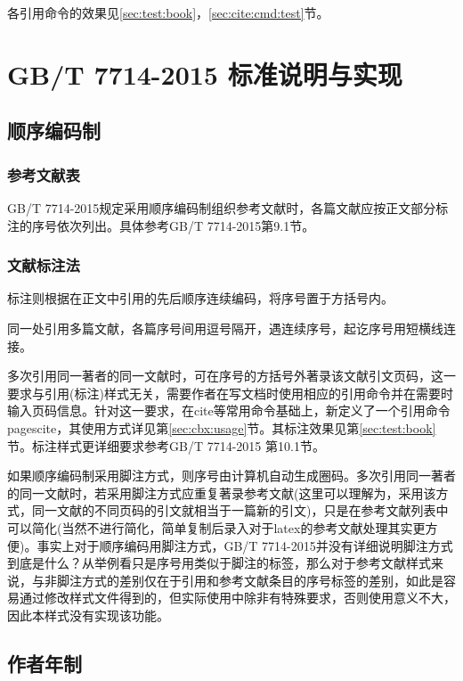 各引用命令的效果见\ref{sec:test:book}，\ref{sec:cite:cmd:test}节。

\section{GB/T 7714-2015 标准说明与实现}

\subsection{顺序编码制}

\subsubsection{参考文献表}\label{sec:bib:serialno}

GB/T 7714-2015规定采用顺序编码制组织参考文献时，各篇文献应按正文部分标注的序号依次列出。具体参考GB/T 7714-2015第9.1节。

\subsubsection{文献标注法}
标注则根据在正文中引用的先后顺序连续编码，将序号置于方括号内。

同一处引用多篇文献，各篇序号间用逗号隔开，遇连续序号，起讫序号用短横线连接。

多次引用同一著者的同一文献时，可在序号的方括号外著录该文献引文页码，这一要求与引用(标注)样式无关，需要作者在写文档时使用相应的引用命令并在需要时输入页码信息。针对这一要求，在cite等常用命令基础上，新定义了一个引用命令pagescite，其使用方式详见第\ref{sec:cbx:usage}节。其标注效果见第\ref{sec:test:book}节。标注样式更详细要求参考GB/T 7714-2015 第10.1节。

如果顺序编码制采用脚注方式，则序号由计算机自动生成圈码。多次引用同一著者的同一文献时，若采用脚注方式应重复著录参考文献(这里可以理解为，采用该方式，同一文献的不同页码的引文就相当于一篇新的引文)，只是在参考文献列表中可以简化(当然不进行简化，简单复制后录入对于latex的参考文献处理其实更方便)。事实上对于顺序编码用脚注方式，GB/T 7714-2015并没有详细说明脚注方式到底是什么？从举例看只是序号用类似于脚注的标签，那么对于参考文献样式来说，与非脚注方式的差别仅在于引用和参考文献条目的序号标签的差别，如此是容易通过修改样式文件得到的，但实际使用中除非有特殊要求，否则使用意义不大，因此本样式没有实现该功能。

\subsection{作者年制}

